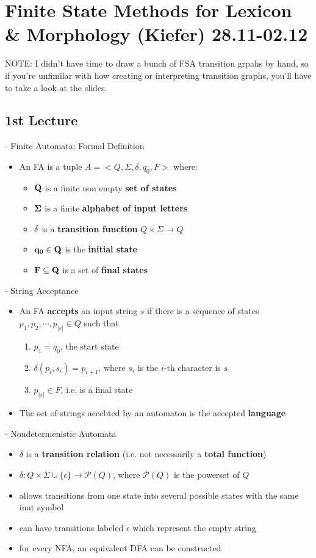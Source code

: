 \documentclass[11pt]{article}
\begin{document}
\section{Finite State Methods for Lexicon \& Morphology (Kiefer) 28.11-02.12}
NOTE: I didn't have time to draw a bunch of FSA transition grpahs by hand, so if you're unfimilar with how creating or interpreting transition graphs, you'll have to take a look at the slides.

\subsection{ 1st Lecture }

- Finite Automata: Formal Definition
\begin{itemize}
 \item An FA is a tuple $A=<Q, \Sigma , \delta , q_0 , F>$ where:
  \begin{itemize}
   \item ${\bf Q}$ is a finite non empty {\bf set of states}
   \item ${\bf \Sigma}$ is a finite {\bf alphabet of input letters}
   \item ${\bf \delta}$ is a {\bf transition function} $Q \times \Sigma \rightarrow Q $
   \item ${\bf q_0 \in Q}$ is the {\bf initial state}
   \item ${\bf F \subseteq Q}$ is a set of {\bf final states}
  \end{itemize}
\end{itemize}
- String Acceptance
\begin{itemize}
 \item An FA {\bf accepts} an input string $s$ if there is a sequence of states $p_1 , p_2 , \dotsi , p_{|s|} \in Q$ such that
  \begin{enumerate}
   \item $p_1 = q_0$, the start state
   \item $\delta(p_i , s_i ) = p_{i+1}$, where $s_i$ is the $i$-th character is $s$
   \item $p_{|s|} \in F$, i.e. is a final state
  \end{enumerate}
 \item The set of strings accebted by an automaton is the accepted {\bf language}
\end{itemize}
- Nondetermenistic Automata
\begin{itemize}
 \item $\delta$ is a {\bf transition relation} (i.e. not necessarily a {\bf total function})
 \item $\delta : Q \times \Sigma \cup \{ \epsilon \} \rightarrow \mathcal{P}(Q)$, where $\mathcal{P}(Q)$ is the powerset of $Q$
 \item allows transitions from one state into several possible states with the same inut symbol
 \item can have transitions labeled $\epsilon$ which represent the empty string
 \item for every NFA, an equivalent DFA can be constructed
\end{itemize}
\end{document}
